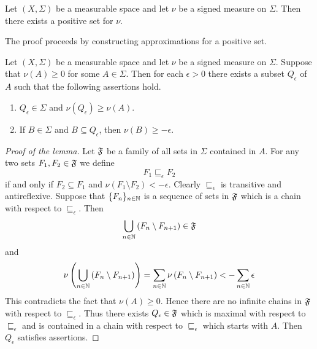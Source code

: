 \begin{theorem}\label{theorem:Hahn_decomposition}
    Let $\left(X,\Sigma\right)$ be a measurable space and let $\nu$ be a signed measure on $\Sigma$. Then there exists a positive set for $\nu$.
\end{theorem}
\noindent
The proof proceeds by constructing approximations for a positive set.

\begin{lemma}\label{lemma:approximate_positive_set}
    Let $\left(X,\Sigma\right)$ be a measurable space and let $\nu$ be a signed measure on $\Sigma$. Suppose that $\nu(A) \geq 0$ for some $A \in \Sigma$. Then for each $\epsilon > 0$ there exists a subset $Q_{\epsilon}$ of $A$ such that the following assertions hold.
    \begin{enumerate}[label=\emph{\textbf{(\arabic*)}}, leftmargin=3.0em]
        \item $Q_{\epsilon} \in \Sigma$ and $\nu(Q_{\epsilon}) \geq \nu(A)$.
        \item If $B \in \Sigma$ and $B \subseteq Q_{\epsilon}$, then $\nu(B) \geq -\epsilon$.
    \end{enumerate}
\end{lemma}
\begin{proof}[Proof of the lemma]
    Let ${\mathfrak F}$ be a family of all sets in $\Sigma$ contained in $A$. For any two sets $F_1,F_2\in {\mathfrak F}$ we define
    $$F_1 \sqsubseteq_{\epsilon}F_2$$
    if and only if $F_2 \subseteq F_1$ and $\nu(F_1 \setminus F_2) < -\epsilon$. Clearly $\sqsubseteq_{\epsilon}$ is transitive and antireflexive. Suppose that $\{F_n\}_{n\in {\mathbb N}}$ is a sequence of sets in ${\mathfrak F}$ which is a chain with respect to $\sqsubseteq_{\epsilon}$. Then
    $$\bigcup_{n\in {\mathbb N}}\left(F_n\setminus F_{n+1}\right) \in {\mathfrak F}$$
    and
    $$\nu\left(\bigcup_{n\in {\mathbb N}}\left(F_n\setminus F_{n+1}\right)\right) = \sum_{n\in {\mathbb N}}\nu\left(F_n\setminus F_{n+1}\right) < -\sum_{n\in {\mathbb N}}\epsilon$$
    This contradicts the fact that $\nu(A) \geq 0$. Hence there are no infinite chains in ${\mathfrak F}$ with respect to $\sqsubseteq_{\epsilon}$. Thus there exists $Q_{\epsilon} \in {\mathfrak F}$ which is maximal with respect to $\sqsubseteq_{\epsilon}$ and is contained in a chain with respect to $\sqsubseteq_{\epsilon}$ which starts with $A$. Then $Q_{\epsilon}$ satisfies assertions.
\end{proof}

